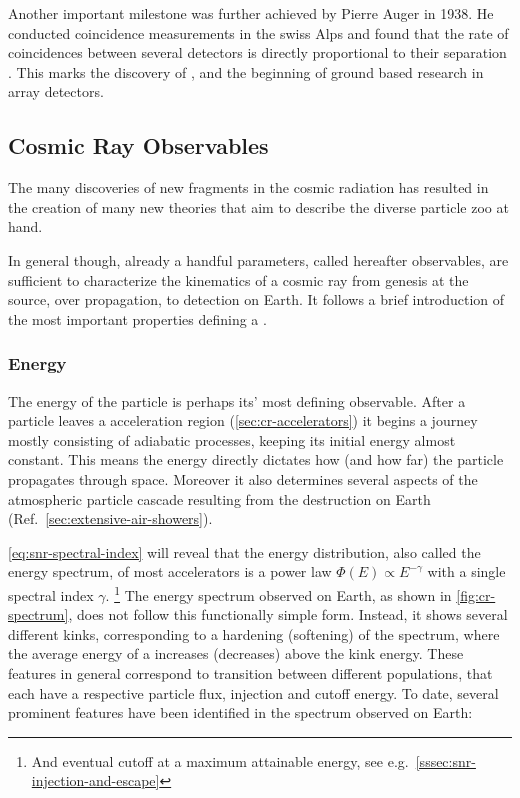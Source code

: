 Another important milestone was further achieved by Pierre Auger in 1938. He 
conducted coincidence measurements in the swiss Alps and found that the rate of
coincidences between several \CR detectors is directly proportional to their 
separation \cite{augerExtensiveCosmicRayShowers1939}. This marks the discovery 
of \EAS, and the beginning of ground based \CR research in array detectors.

\subsection{Cosmic Ray Observables}

The many discoveries of new fragments in the cosmic radiation has resulted in
the creation of many new theories that aim to describe the diverse particle zoo
at hand. 

In general though, already a handful parameters, called hereafter \CR 
observables, are sufficient to characterize the kinematics of a cosmic ray from
genesis at the source, over propagation, to detection on Earth. It follows a 
brief introduction of the most important properties defining a \CR.

\subsubsection{Energy}
\label{sssec:energy}

The energy of the \CR particle is perhaps its' most defining observable. After 
a particle leaves a \CR acceleration region (\cref{sec:cr-accelerators}) it 
begins a journey mostly consisting of adiabatic processes, keeping its initial
energy almost constant. This means the \CR energy directly dictates how (and 
how far) the particle propagates through space. Moreover it also determines
several aspects of the atmospheric particle cascade resulting from the 
destruction on Earth (Ref.\ \cref{sec:extensive-air-showers}).

\cref{eq:snr-spectral-index} will reveal that the energy distribution, also 
called the energy spectrum, of most \CR accelerators is a power law 
$\Phi(E) \propto E^{-\gamma}$ with a single spectral index $\gamma$.
\footnote{And eventual cutoff at a maximum attainable energy, see e.g.\ 
\cref{sssec:snr-injection-and-escape}} The energy spectrum observed on Earth,
as shown in \cref{fig:cr-spectrum}, does not follow this functionally simple 
form. Instead, it shows several different kinks, corresponding to a hardening 
(softening) of the spectrum, where the average energy of a \CR increases 
(decreases) above the kink energy. These features in general correspond to 
transition between different \CR populations, that each have a respective 
particle flux, injection and cutoff energy. To date, several prominent features
have been identified in the \CR spectrum observed on Earth:

